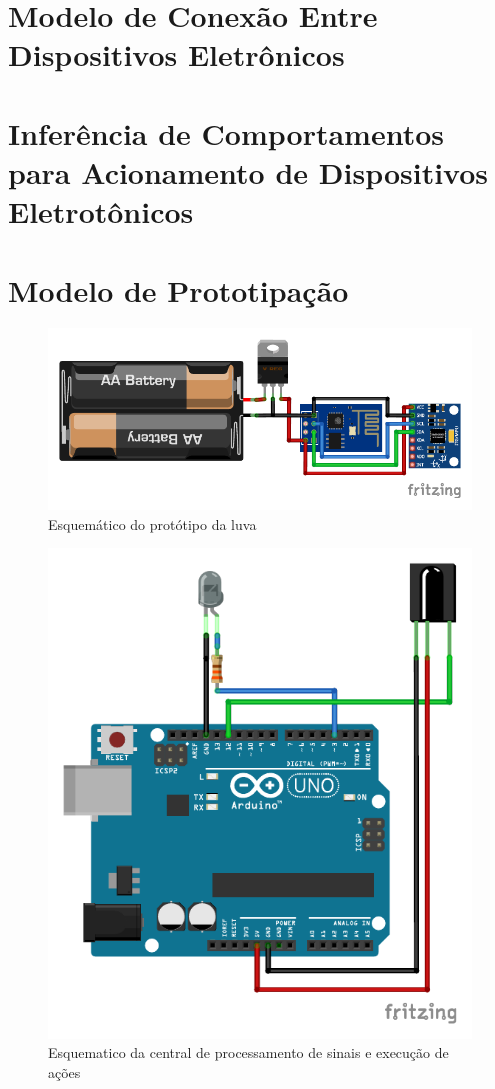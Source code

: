 \section{Modelo de Conexão Entre Dispositivos Eletrônicos}

\section{Inferência de Comportamentos para Acionamento de Dispositivos Eletrotônicos}

\section{Modelo de Prototipação}

\begin{figure}
    \centering
    \includegraphics{resources/esquematico_tcc_bb.pdf}
    \caption{Esquemático do protótipo da luva}
    \label{fig:my_label}
\end{figure}

\begin{figure}
    \centering
    \includegraphics{resources/esquematico_central_bb.pdf}
    \caption{Esquematico da central de processamento de sinais e execução de ações}
    \label{fig:esq_central}
\end{figure}

